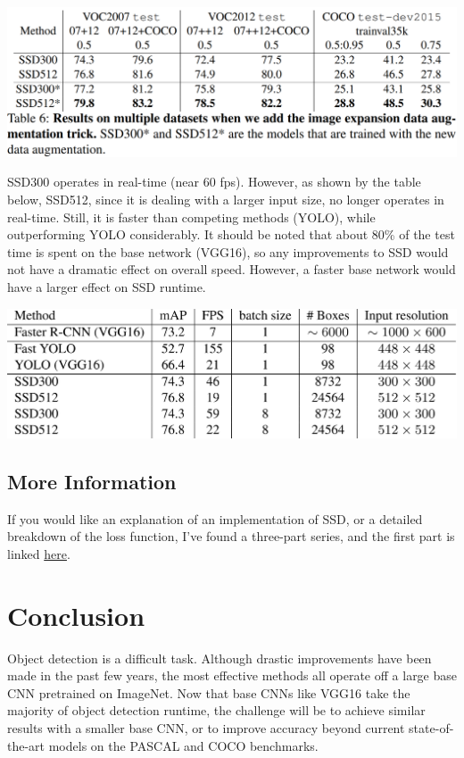 \documentclass{article}
\begin{document}
\begin{center}
\includegraphics[scale=0.4]{ssdaugmentation.PNG}
\end{center}

SSD300 operates in real-time (near 60 fps). However, as shown by the table below, SSD512, since it is dealing with a larger input size, no longer operates in real-time. Still, it is faster than competing methods (YOLO), while outperforming YOLO considerably. It should be noted that about 80\% of the test time is spent on the base network (VGG16), so any improvements to SSD would not have a dramatic effect on overall speed. However, a faster base network would have a larger effect on SSD runtime.

\begin{center}
\includegraphics[scale=0.35]{ssdoverall.PNG}
\end{center}

\subsection{More Information}

If you would like an explanation of an implementation of SSD, or a detailed breakdown of the loss function, I've found a three-part series, and the first part is linked \href{https://towardsdatascience.com/learning-note-single-shot-multibox-detector-with-pytorch-part-1-38185e84bd79}{here}.

\section{Conclusion}

Object detection is a difficult task. Although drastic improvements have been made in the past few years, the most effective methods all operate off a large base CNN pretrained on ImageNet. Now that base CNNs like VGG16 take the majority of object detection runtime, the challenge will be to achieve similar results with a smaller base CNN, or to improve accuracy beyond current state-of-the-art models on the PASCAL and COCO benchmarks.
\end{document}
